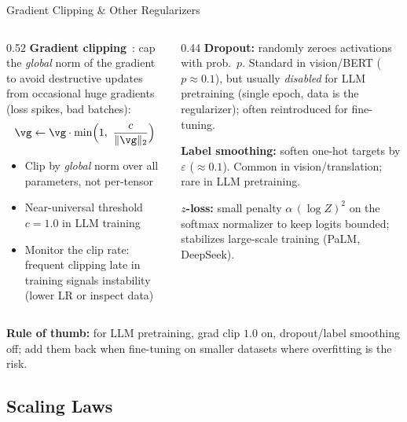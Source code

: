 \begin{frame}{Gradient Clipping \& Other Regularizers}

  \begin{columns}[T]
    \begin{column}{0.52\textwidth}
      \textbf{Gradient clipping}~\cite{pascanu2013difficulty}: cap the \emph{global} norm of the gradient to avoid destructive updates from occasional huge gradients (loss spikes, bad batches):
      \[
        \vg \leftarrow \vg \cdot \min\!\Big(1,\ \frac{c}{\|\vg\|_2}\Big)
      \]
      \begin{itemize}
        \item Clip by \emph{global} norm over all parameters, not per-tensor
        \item Near-universal threshold $c = 1.0$ in LLM training
        \item Monitor the clip rate: frequent clipping late in training signals instability (lower LR or inspect data)
      \end{itemize}
    \end{column}
    \begin{column}{0.44\textwidth}
      \textbf{Dropout:} randomly zeroes activations with prob.\ $p$. Standard in vision/BERT ($p\approx0.1$), but usually \emph{disabled} for LLM pretraining (single epoch, data is the regularizer); often reintroduced for fine-tuning.

      \vspace{0.3em}
      \textbf{Label smoothing:} soften one-hot targets by $\varepsilon$ ($\approx 0.1$). Common in vision/translation; rare in LLM pretraining.

      \vspace{0.3em}
      \textbf{$z$-loss:} small penalty $\alpha\,(\log Z)^2$ on the softmax normalizer to keep logits bounded; stabilizes large-scale training (PaLM, DeepSeek).
    \end{column}
  \end{columns}

  \vspace{0.3em}
  {\small \textbf{Rule of thumb:} for LLM pretraining, grad clip $1.0$ on, dropout/label smoothing off; add them back when fine-tuning on smaller datasets where overfitting is the risk.}
\end{frame}

\subsection{Scaling Laws}

